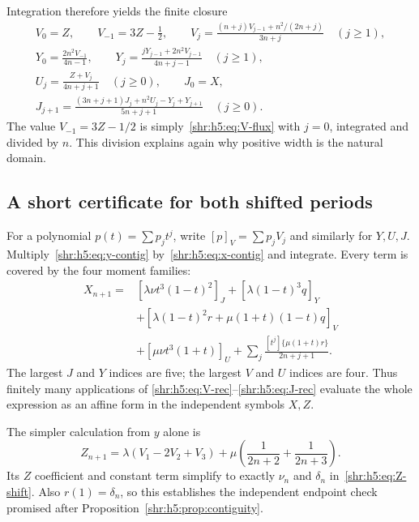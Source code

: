 \documentclass[11pt,letterpaper]{article}
\numberwithin{equation}{section}
\theoremstyle{definition}
\newcommand{\1}{\mathbf 1}
\begin{document}
Integration therefore yields the finite closure
\begin{gather}
 V_0=Z,\qquad V_{-1}=3Z-\tfrac12,\qquad
 V_j=\frac{(n+j)V_{j-1}+n^2/(2n+j)}{3n+j}\quad(j\ge1),
 \label{shr:h5:eq:V-rec}\\
 Y_0=\frac{2n^2V_{-1}}{4n-1},\qquad
 Y_j=\frac{jY_{j-1}+2n^2V_{j-1}}{4n+j-1}\quad(j\ge1),
 \label{shr:h5:eq:Y-rec}\\
 U_j=\frac{Z+V_j}{4n+j+1}\quad(j\ge0),\qquad J_0=X,\\
 J_{j+1}=\frac{(3n+j+1)J_j+n^2U_j-Y_j+Y_{j+1}}{5n+j+1}
     \quad(j\ge0).
 \label{shr:h5:eq:J-rec}
\end{gather}
The value $V_{-1}=3Z-1/2$ is simply~\eqref{shr:h5:eq:V-flux} with $j=0$,
integrated and divided by $n$. This division explains again why positive
width is the natural domain.

\subsection{A short certificate for both shifted periods}
For a polynomial $p(t)=\sum p_jt^j$, write
$[p]_V=\sum p_jV_j$ and similarly for $Y,U,J$.
Multiply~\eqref{shr:h5:eq:y-contig} by~\eqref{shr:h5:eq:x-contig} and integrate.
Every term is covered by the four moment families:
\begin{align}
 X_{n+1}={}&[\lambda\nu t^3(1-t)^2]_J
       +[\lambda(1-t)^3q]_Y\\
 &+[\lambda(1-t)^2r+\mu(1+t)(1-t)q]_V\\
 &+[\mu\nu t^3(1+t)]_U
       +\sum_j\frac{[t^j]\{\mu(1+t)r\}}{2n+j+1}.
 \label{shr:h5:eq:X-certificate}
\end{align}
The largest $J$ and $Y$ indices are five; the largest $V$ and $U$
indices are four. Thus finitely many applications of
\eqref{shr:h5:eq:V-rec}--\eqref{shr:h5:eq:J-rec} evaluate the whole expression
as an affine form in the independent symbols $X,Z$.

The simpler calculation from $y$ alone is
\begin{equation}
 Z_{n+1}=\lambda(V_1-2V_2+V_3)
       +\mu\left(\frac1{2n+2}+\frac1{2n+3}\right).
 \label{shr:h5:eq:Z-certificate}
\end{equation}
Its $Z$ coefficient and constant term simplify to exactly $\nu_n$ and
$\delta_n$ in~\eqref{shr:h5:eq:Z-shift}. Also $r(1)=\delta_n$, so
this establishes the independent endpoint check promised after
Proposition~\ref{shr:h5:prop:contiguity}.
\end{document}
